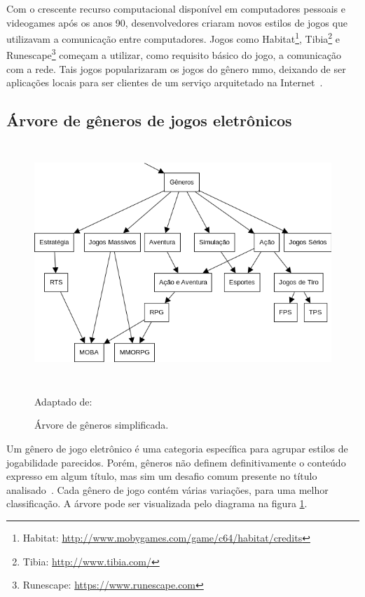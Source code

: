 Com o crescente recurso computacional disponível em computadores pessoais e videogames após os anos 90, desenvolvedores criaram novos estilos de jogos que utilizavam a comunicação entre computadores.
%
Jogos como Habitat\footnote{Habitat: \url{http://www.mobygames.com/game/c64/habitat/credits}}, Tibia\footnote{Tibia: \url{http://www.tibia.com/}} e Runescape\footnote{Runescape: \url{https://www.runescape.com}} começam a utilizar, como requisito básico do jogo, a comunicação com a rede.
%
Tais jogos popularizaram os jogos do gênero \ac{mmo}, deixando de ser aplicações locais para ser clientes de um serviço arquitetado na Internet~\cite{adams_1208533, Adams2014Jan}.



\subsection{Árvore de gêneros de jogos eletrônicos}



\begin{figure}[htb!]
\caption{Árvore de gêneros simplificada.}
\label{fig:generos}
\includegraphics[height=9cm]{img/cap2/generos.png}
\centering

Adaptado de:~\cite{adams_1208533}
\end{figure}



Um gênero de jogo eletrônico é uma categoria específica para agrupar estilos de jogabilidade parecidos.
%
Porém, gêneros não definem definitivamente o conteúdo expresso em algum título, mas sim um desafio comum presente no título analisado~\cite{adams_1208533, video_game_technologies}.
%
Cada gênero de jogo contém várias variações, para uma melhor classificação.
%
A árvore pode ser visualizada pelo diagrama na figura \ref{fig:generos}.



